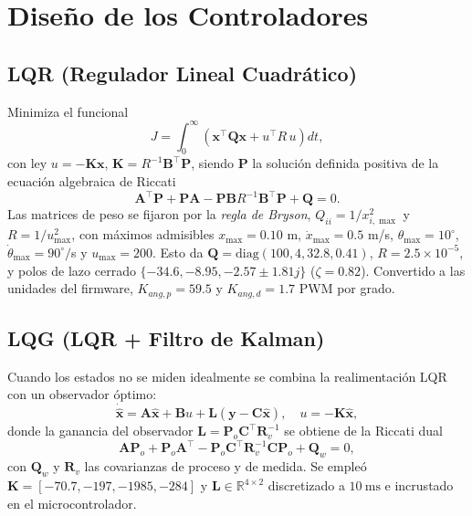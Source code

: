\documentclass[conference]{IEEEtran}
\newcommand{\vect}[1]{\mathbf{#1}}
\newcommand{\mat}[1]{\mathbf{#1}}
\begin{document}
\section{Dise\~no de los Controladores}
\subsection{LQR (Regulador Lineal Cuadr\'atico)}
Minimiza el funcional
\begin{equation}
J=\int_0^\infty\!\left(\vect{x}^\top\mat{Q}\vect{x}+u^\top R\,u\right)dt,
\end{equation}
con ley $u=-\mat{K}\vect{x}$, $\mat{K}=R^{-1}\mat{B}^\top\mat{P}$, siendo
$\mat{P}$ la soluci\'on definida positiva de la ecuaci\'on algebraica de Riccati
\begin{equation}
\mat{A}^\top\mat{P}+\mat{P}\mat{A}-\mat{P}\mat{B}R^{-1}\mat{B}^\top\mat{P}+\mat{Q}=0.
\end{equation}
Las matrices de peso se fijaron por la \emph{regla de Bryson},
$Q_{ii}=1/x_{i,\max}^2$ y $R=1/u_{\max}^2$, con m\'aximos admisibles
$x_{\max}=0.10$ m, $\dot{x}_{\max}=0.5$ m/s, $\theta_{\max}=10^\circ$,
$\dot\theta_{\max}=90^\circ/$s y $u_{\max}=200$. Esto da
$\mat{Q}=\mathrm{diag}(100,4,32.8,0.41)$, $R=2.5\times10^{-5}$, y polos de lazo
cerrado $\{-34.6,-8.95,-2.57\pm1.81j\}$ ($\zeta=0.82$). Convertido a las unidades
del firmware, $K_{ang,p}=59.5$ y $K_{ang,d}=1.7$ PWM por grado.

\subsection{LQG (LQR + Filtro de Kalman)}
Cuando los estados no se miden idealmente se combina la realimentaci\'on LQR con
un observador \'optimo:
\begin{equation}
\dot{\hat{\vect{x}}}=\mat{A}\hat{\vect{x}}+\mat{B}u+\mat{L}\!\left(\vect{y}-\mat{C}\hat{\vect{x}}\right),\quad u=-\mat{K}\hat{\vect{x}},
\end{equation}
donde la ganancia del observador $\mat{L}=\mat{P}_o\mat{C}^\top\mat{R}_v^{-1}$ se
obtiene de la Riccati dual
\begin{equation}
\mat{A}\mat{P}_o+\mat{P}_o\mat{A}^\top-\mat{P}_o\mat{C}^\top\mat{R}_v^{-1}\mat{C}\mat{P}_o+\mat{Q}_w=0,
\end{equation}
con $\mat{Q}_w$ y $\mat{R}_v$ las covarianzas de proceso y de medida. Se emple\'o
$\mat{K}=[-70.7,-197,-1985,-284]$ y $\mat{L}\in\mathbb{R}^{4\times2}$ discretizado
a $10~\mathrm{ms}$ e incrustado en el microcontrolador.
\end{document}
